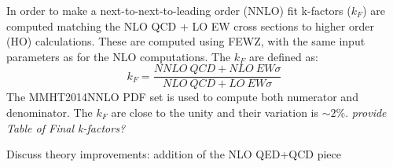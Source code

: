 In order to make a next-to-next-to-leading order (NNLO) fit k-factors ($k_{F}$) are computed matching
 the NLO QCD + LO EW cross sections to higher order (HO) calculations. These are computed using 
FEWZ, with the same input parameters as for the NLO computations. The $k_{F}$ are defined as:
\begin{equation}
k_{F}=\frac{NNLO\  QCD  + NLO\  EW \sigma}{NLO\  QCD + LO\  EW \sigma}
\end{equation}
The MMHT2014NNLO PDF set is used to compute both numerator and denominator.
 The $k_{F}$ are close to the unity and their variation is $\sim 2\%$. {\it provide Table of Final k-factors?}


Discuss theory improvements: addition of the NLO QED+QCD piece 
